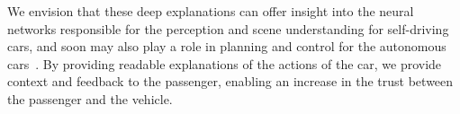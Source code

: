 We envision that these deep explanations can offer insight into the neural networks responsible for the perception and scene understanding for self-driving cars, and soon may also play a role in planning and control for the autonomous cars~\cite{bojarski2016end}.
By providing readable explanations of the actions of the car, we provide context and feedback to the passenger, enabling an increase in the trust between the passenger and the vehicle.
